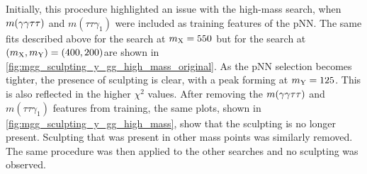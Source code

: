 Initially, this procedure highlighted an issue with the high-mass \XYggHtt search, when $m(\gamma\gamma\tau\tau)$ and $m(\tau\tau\gamma_1)$ were included as training features of the pNN. The same fits described above for the \XTwoHH search at $m_{\mathrm{X}} = 550$ \GeV but for the \XYggHtt search at $(m_{\mathrm{X}}, m_{\mathrm{Y}}) = (400, 200)$\GeV are shown in \cref{fig:mgg_sculpting_y_gg_high_mass_original}. As the pNN selection becomes tighter, the presence of sculpting is clear, with a peak forming at $m_{\mathrm{Y}}=125$\GeV. This is also reflected in the higher $\chi^2$ values. After removing the $m(\gamma\gamma\tau\tau)$ and $m(\tau\tau\gamma_1)$ features from training, the same plots, shown in \cref{fig:mgg_sculpting_y_gg_high_mass}, show that the sculpting is no longer present. Sculpting that was present in other mass points was similarly removed. The same procedure was then applied to the other searches and no sculpting was observed.

